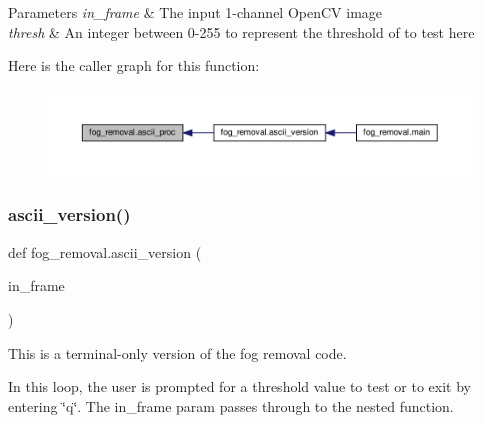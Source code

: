 \begin{DoxyParams}{Parameters}
{\em in\+\_\+frame} & The input 1-\/channel Open\+CV image \\
\hline
{\em thresh} & An integer between 0-\/255 to represent the threshold of to test here \\
\hline
\end{DoxyParams}
Here is the caller graph for this function\+:
\nopagebreak
\begin{figure}[H]
\begin{center}
\leavevmode
\includegraphics[width=350pt]{namespacefog__removal_a50fdb2a1e3f55a7f77230a689a372876_icgraph}
\end{center}
\end{figure}
\mbox{\label{namespacefog__removal_a6e25df53e59d9d8848b5e2ed5a399ea3}} 
\subsubsection{\texorpdfstring{ascii\+\_\+version()}{ascii\_version()}}
{\footnotesize\ttfamily def fog\+\_\+removal.\+ascii\+\_\+version (\begin{DoxyParamCaption}\item[{}]{in\+\_\+frame }\end{DoxyParamCaption})}



This is a terminal-\/only version of the fog removal code. 

In this loop, the user is prompted for a threshold value to test or to exit by entering \char`\"{}q\char`\"{}. The in\+\_\+frame param passes through to the nested function.


